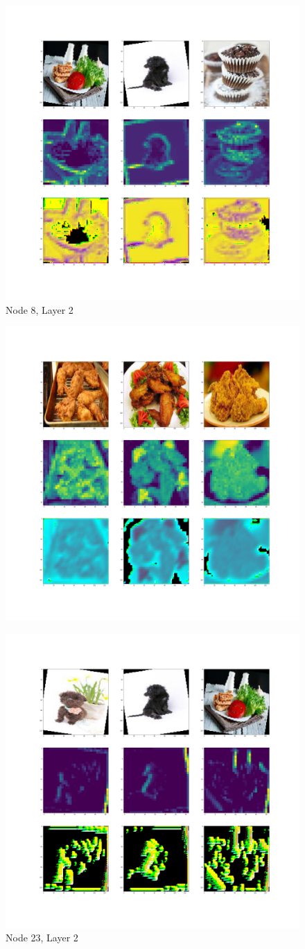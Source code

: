 \documentclass[12pt]{article}
\begin{document}
\begin{figure}[H]
	\centering
	\includegraphics[width=0.7\linewidth]{../diagrams/node8_layer2_DMF}
	\caption{Node 8, Layer 2}
	\label{fig:node8layer2dmf}
\end{figure}
\begin{figure}
\centering
\includegraphics[width=0.7\linewidth]{../diagrams/node15_layer2_DMF}
\caption[Node 15, Layer 2]{}
\caption{}
\label{fig:node15layer2dmf}
\end{figure}
\begin{figure}[H]
	\centering
	\includegraphics[width=0.7\linewidth]{../diagrams/node23_layer2_DMF}
	\caption{Node 23, Layer 2}
	\label{fig:node23layer2dmf}
\end{figure}
\end{document}

